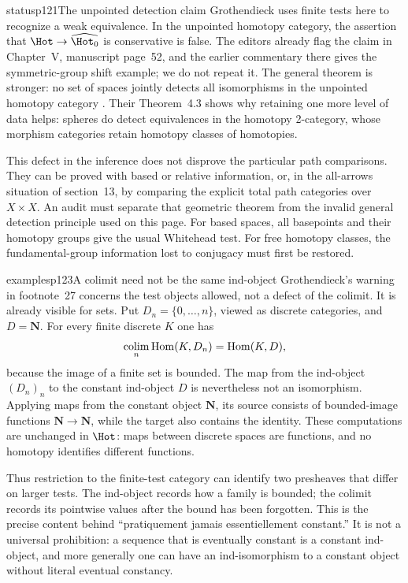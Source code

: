 \begin{dcomment}{status}{p121}{The unpointed detection claim}
Grothendieck uses finite tests here to recognize a weak equivalence. In the unpointed homotopy category, the assertion that $\Hot\to\widehat{\Hot_0}$ is conservative is false. The editors already flag the claim in Chapter~V, manuscript page~52, and the earlier commentary there gives the symmetric-group shift example; we do not repeat it. The general theorem is stronger: no set of spaces jointly detects all isomorphisms in the unpointed homotopy category \citep[Theorem~2.1]{ArlinChristensen2023}. Their Theorem~4.3 shows why retaining one more level of data helps: spheres do detect equivalences in the homotopy 2-category, whose morphism categories retain homotopy classes of homotopies.

This defect in the inference does not disprove the particular path comparisons. They can be proved with based or relative information, or, in the all-arrows situation of section~13, by comparing the explicit total path categories over $X\times X$. An audit must separate that geometric theorem from the invalid general detection principle used on this page. For based spaces, all basepoints and their homotopy groups give the usual Whitehead test. For free homotopy classes, the fundamental-group information lost to conjugacy must first be restored.
\end{dcomment}

\begin{dcomment}{examples}{p123}{A colimit need not be the same ind-object}
Grothendieck's warning in footnote~27 concerns the test objects allowed, not a defect of the colimit. It is already visible for sets. Put $D_n=\{0,\ldots,n\}$, viewed as discrete categories, and $D=\mathbf N$. For every finite discrete $K$ one has
\[
 \mathop{\rm colim}_n\mathrm{Hom}(K,D_n)=\mathrm{Hom}(K,D),
\]
because the image of a finite set is bounded. The map from the ind-object $(D_n)_n$ to the constant ind-object $D$ is nevertheless not an isomorphism. Applying maps from the constant object $\mathbf N$, its source consists of bounded-image functions $\mathbf N\to\mathbf N$, while the target also contains the identity. These computations are unchanged in $\Hot$: maps between discrete spaces are functions, and no homotopy identifies different functions.

Thus restriction to the finite-test category can identify two presheaves that differ on larger tests. The ind-object records how a family is bounded; the colimit records its pointwise values after the bound has been forgotten. This is the precise content behind ``pratiquement jamais essentiellement constant.'' It is not a universal prohibition: a sequence that is eventually constant is a constant ind-object, and more generally one can have an ind-isomorphism to a constant object without literal eventual constancy.
\end{dcomment}

